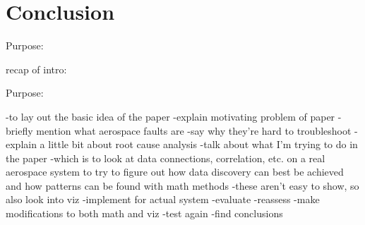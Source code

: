 \chapter{Conclusion}

Purpose:

recap of intro:

Purpose:

-to lay out the basic idea of the paper
-explain motivating problem of paper
-briefly mention what aerospace faults are
-say why they're hard to troubleshoot
-explain a little bit about root cause analysis
-talk about what I'm trying to do in the paper
-which is to look at data connections, correlation, etc. on a real aerospace system to try to figure out how data discovery can best be achieved and how patterns can be found with math methods
-these aren't easy to show, so also look into viz
-implement for actual system
-evaluate
-reassess
-make modifications to both math and viz
-test again
-find conclusions

